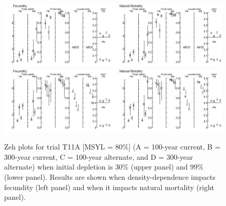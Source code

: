 \documentclass{article}\usepackage[]{graphicx}\usepackage[]{color}
\providecommand\phantomsection{}
\begin{document}
\begin{landscape}


\phantomsection
{}
\setcounter{figure}{0}


\begin{figure}[H]
\centering
\includegraphics[]{SC66aRMP10_Part2_T11A-R.jpeg}
\includegraphics[]{SC66aRMP10_Part2_T11A-D.jpeg}
\caption{
Zeh plots for trial T11A
[MSYL = 80\%]
(A = 100-year current, B = 300-year current, C = 100-year alternate, and D = 300-year alternate)
when initial depletion is 30\% (upper panel) and 99\% (lower panel).
Results are shown when density-dependence impacts fecundity (left panel) and when it impacts natural mortality (right panel).
}
\end{figure}


\end{landscape}
\end{document}
